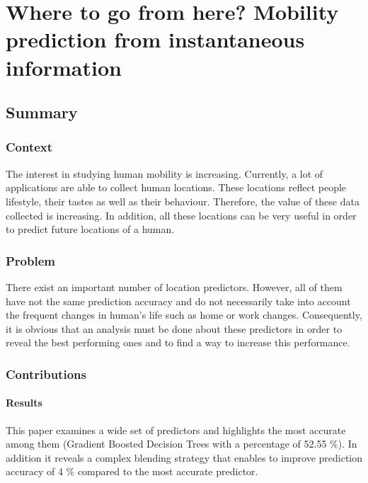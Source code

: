 \newpage
\section{Where to go from here? Mobility prediction from instantaneous information \cite{etter:prediction}} \label{lect5}

\subsection{Summary} \label{lect5-sum}

\subsubsection{Context}

The interest in studying human mobility is increasing. Currently, a lot of applications are able to collect human locations. These locations reflect people lifestyle, their tastes as well as their behaviour. Therefore, the value of these data collected is increasing. In addition, all these locations can be very useful in order to predict future locations of a human.

\subsubsection{Problem}

There exist an important number of location predictors. However, all of them have not the same prediction accuracy and do not necessarily take into account the frequent changes in human's life such as home or work changes. Consequently, it is obvious that an analysis must be done about these predictors in order to reveal the best performing ones and to find a way to increase this performance.

\subsubsection{Contributions}

\paragraph{Results}

This paper examines a wide set of predictors and highlights the most accurate among them (Gradient Boosted Decision Trees with a percentage of 52.55 \%). In addition it reveals a complex blending strategy that enables to improve prediction accuracy of 4 \% compared to the most accurate predictor.

